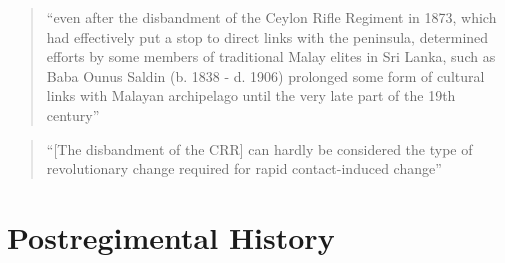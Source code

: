 \begin{quote}
    ``even after the disbandment of the Ceylon Rifle Regiment in 1873, which had effectively put a stop to direct links with the peninsula, determined efforts by some members of traditional Malay elites in Sri Lanka, such as Baba Ounus Saldin (b. 1838 - d. 1906) prolonged some form of cultural links with Malayan archipelago until the very late part of the 19th century''\citet[13]{Hussainmiya1987}
\end{quote}

\begin{quotation}
    ``[The disbandment of the CRR] can hardly be considered the type of revolutionary change required for rapid contact-induced change''\citet[19]{SmithRH}
\end{quotation}

\section{Postregimental History}\label{sec:slmbg:PostregimentalHistory}
